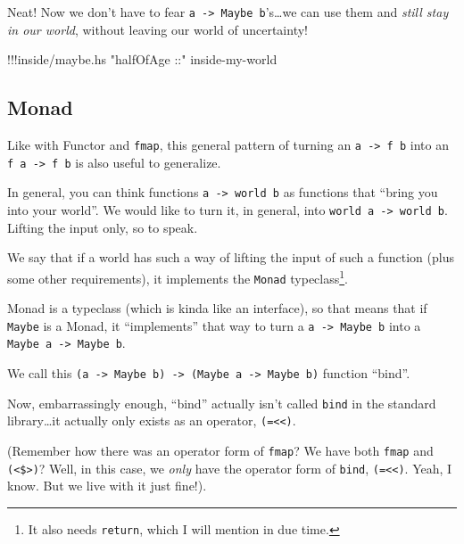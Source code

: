 \documentclass[]{article}
\newenvironment{Shaded}{}{}
\newcommand{\StringTok}[1]{\textcolor[rgb]{0.25,0.44,0.63}{{#1}}}
\newcommand{\FunctionTok}[1]{\textcolor[rgb]{0.02,0.16,0.49}{{#1}}}
\newcommand{\NormalTok}[1]{{#1}}
\begin{document}
Neat! Now we don't have to fear
\texttt{a\ -\textgreater{}\ Maybe\ b}'s\ldots{}we can use them and
\emph{still stay in our world}, without leaving our world of
uncertainty!

\begin{Shaded}
\begin{Highlighting}[]
\FunctionTok{!!!}\NormalTok{inside}\FunctionTok{/}\NormalTok{maybe}\FunctionTok{.}\NormalTok{hs }\StringTok{"halfOfAge ::"} \NormalTok{inside}\FunctionTok{-}\NormalTok{my}\FunctionTok{-}\NormalTok{world}
\end{Highlighting}
\end{Shaded}

\subsection{Monad}\label{monad}

Like with Functor and \texttt{fmap}, this general pattern of turning an
\texttt{a\ -\textgreater{}\ f\ b} into an
\texttt{f\ a\ -\textgreater{}\ f\ b} is also useful to generalize.

In general, you can think functions
\texttt{a\ -\textgreater{}\ world\ b} as functions that ``bring you into
your world''. We would like to turn it, in general, into
\texttt{world\ a\ -\textgreater{}\ world\ b}. Lifting the input only, so
to speak.

We say that if a world has such a way of lifting the input of such a
function (plus some other requirements), it implements the
\texttt{Monad} typeclass\footnote{It also needs \texttt{return}, which I
  will mention in due time.}.

Monad is a typeclass (which is kinda like an interface), so that means
that if \texttt{Maybe} is a Monad, it ``implements'' that way to turn a
\texttt{a\ -\textgreater{}\ Maybe\ b} into a
\texttt{Maybe\ a\ -\textgreater{}\ Maybe\ b}.

We call this
\texttt{(a\ -\textgreater{}\ Maybe\ b)\ -\textgreater{}\ (Maybe\ a\ -\textgreater{}\ Maybe\ b)}
function ``bind''.

Now, embarrassingly enough, ``bind'' actually isn't called \texttt{bind}
in the standard library\ldots{}it actually only exists as an operator,
\texttt{(=\textless{}\textless{})}.

(Remember how there was an operator form of \texttt{fmap}? We have both
\texttt{fmap} and \texttt{(\textless{}\$\textgreater{})}? Well, in this
case, we \emph{only} have the operator form of \texttt{bind},
\texttt{(=\textless{}\textless{})}. Yeah, I know. But we live with it
just fine!).
\end{document}
